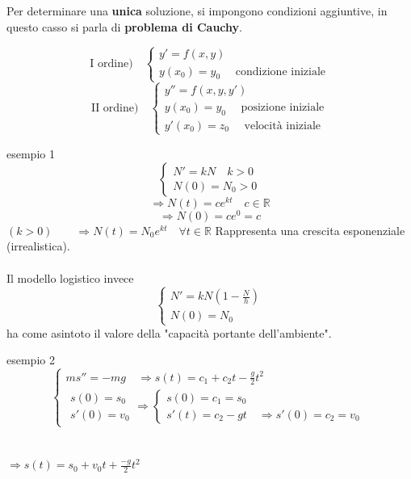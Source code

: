 \documentclass[x11names]{article}
\begin{document}
	
	\noindent
	Per determinare una \textbf{unica} soluzione, si impongono condizioni aggiuntive, in questo casso si parla di \textbf{problema di Cauchy}.
	
	\[
	\text{I ordine)} \quad \begin{cases}
		y' = f(x,y) \\
		y(x_0) = y_0 \quad \text{ condizione iniziale}
		\end{cases} 
	\]
	\[
	\text{II ordine)} \quad \begin{cases}
		y'' = f(x,y,y') \\
		y(x_0) = y_0 \quad \text{ posizione iniziale} \\
		y'(x_0) = z_0 \quad \text{ velocità iniziale}
 	\end{cases} 
	\]
	
	\begin{es}{esempio 1}
	\[
		\begin{cases}
			N' = kN  \quad k>0 \\
			N(0) = N_0  > 0 
		\end{cases} 
	\]
	\[
	\Longrightarrow N(t)  = ce^{kt} \quad c \in \mathbb{R} 
	\]
	\[
	\Longrightarrow N(0) = ce^0 = c
	\]
	$(k>0) \qquad \Longrightarrow N(t) = N_0 e^{kt} \quad \forall t \in \mathbb{R}$
	Rappresenta una crescita esponenziale (irrealistica). \\ \\
	
	\noindent
	Il modello logistico invece
	\[
	\begin{cases}
		N' = kN(1 - \frac{N}{h}) \\
		N(0) = N_0
	\end{cases}
	\]
	ha come asintoto il valore della "capacità portante dell'ambiente".
	\end{es}
	\begin{es}{esempio 2}
	\[
	\begin{cases}
		ms'' = -mg \quad \Longrightarrow s(t) = c_1 + c_2t - \frac{g}{2}t^2 \\
		\begin{array}{c}
		s(0) = s_0 \\
		s'(0) = v_0
		\end{array} 
		\Longrightarrow \begin{cases}
							s(0) = c_1 = s_0 \\
							s'(t) = c_2 -gt \quad \Longrightarrow s'(0) = c_2 = v_0
						\end{cases}
	\end{cases} 
	\]
	\\ \\
	$\Longrightarrow s(t) = s_0 + v_0t + \frac{-g}{2}t^2$
	\end{es}
	
\end{document}
